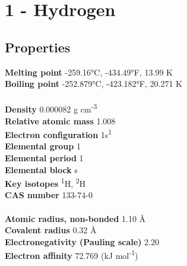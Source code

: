 \section{1 - Hydrogen}
\label{sec:elem-hydrogen}
\subsection{Properties}
\textbf{Melting point} -259.16°C, -434.49°F, 13.99 K\\
\textbf{Boiling point} -252.879°C, -423.182°F, 20.271 K\\
\\
\textbf{Density} 0.000082 g cm\textsuperscript{-3}\\
\textbf{Relative atomic mass} 1.008\\
\textbf{Electron configuration} 1s\textsuperscript{1}\\
\textbf{Elemental group} 1\\
\textbf{Elemental period} 1\\
\textbf{Elemental block} s\\
\textbf{Key isotopes} \textsuperscript{1}H, \textsuperscript{2}H\\
\textbf{CAS number} 133-74-0\\
\\
\textbf{Atomic radius, non-bonded} 1.10 Å\\
\textbf{Covalent radius} 0.32 Å\\
\textbf{Electronegativity (Pauling scale)} 2.20\\
\textbf{Electron affinity} 72.769 (kJ mol\textsuperscript{-1})\\